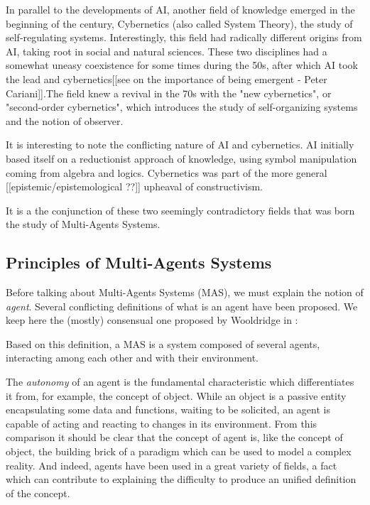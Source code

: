 In parallel to the developments of AI, another field of knowledge emerged in the beginning of the century, Cybernetics (also called System Theory), the study of self-regulating systems. Interestingly, this field had radically different origins from AI, taking root in social and natural sciences. These two disciplines had a somewhat uneasy coexistence for some times during the 50s, after which AI took the lead and cybernetics[[see on the importance of being emergent - Peter Cariani]].The field knew a revival in the 70s with the "new cybernetics", or "second-order cybernetics", which introduces the study of self-organizing systems and the notion of observer.

It is interesting to note the conflicting nature of AI and cybernetics. AI initially based itself on a reductionist approach of knowledge, using symbol manipulation coming from algebra and logics. Cybernetics was part of the more general [[epistemic/epistemological ??]] upheaval of constructivism.

It is a the conjunction of these two seemingly contradictory fields that was born the study of Multi-Agents Systems.

\subsection{Principles of Multi-Agents Systems}

Before talking about Multi-Agents Systems (MAS), we must explain the notion of \emph{agent}. Several conflicting definitions of what is an agent have been proposed. We keep here the (mostly) consensual one proposed by Wooldridge in \cite{wei1999mutiagent}:


Based on this definition, a MAS is a system composed of several agents, interacting among each other and with their environment.

The \emph{autonomy} of an agent is the fundamental characteristic which differentiates it from, for example, the concept of object. While an object is a passive entity encapsulating some data and functions, waiting to be solicited, an agent is capable of acting and reacting to changes in its environment. From this comparison it should be clear that the concept of agent is, like the concept of object, the building brick of a paradigm which can be used to model a complex reality. And indeed, agents have been used in a great variety of fields, a fact which can contribute to explaining the difficulty to produce an unified definition of the concept.

